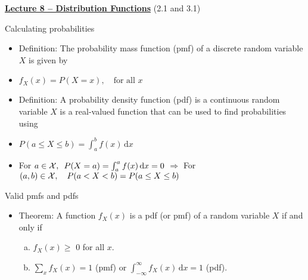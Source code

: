 \documentclass{article}
\newcommand{\bu}[1]{\textbf{\ul{#1}}}				%
\newcommand{\integral}[4]{\int_{#1}^{#2} #3 \,\mathrm{d} #4}		%
\begin{document}
{\large \bu{Lecture 8 -- Distribution Functions}} (2.1 and 3.1)\bigskip

Calculating probabilities
\begin{itemize}
    \item Definition: The probability mass function (pmf) of a discrete random variable $X$ is given by
    \item[] $f_X(x) = P(X = x), \quad \text{for all } x$
    \item Definition: A probability density function (pdf) is a continuous random variable $X$ is a real-valued function that can be used to find probabilities using
    \item[] $P(a \le X \le b) = \integral{a}{b}{f(x)}{x}$
    \item[] For $a \in {\cal X}, \hspace{5pt} P(X = a) = \integral{a}{a}{f(x)}{x} = 0$ \hspace{5pt} $\Longrightarrow$ \hspace{5pt} For $(a, b) \in {\cal X}, \hspace{10pt} P(a < X < b) =  P(a \le X \le b)$
\end{itemize}\bigskip

Valid pmfs and pdfs
\begin{itemize}
    \item Theorem: A function $f_X(x)$ is a pdf (or pmf) of a random variable $X$ if and only if
    \begin{enumerate}[(a)]
        \item  $f_X(x) \ge $ 0 for all $x$.
        \item $\displaystyle \sum_x f_X(x) = 1$ (pmf) \hspace{20pt} or \hspace{20pt} $\integral{-\infty}{\infty} {f_X(x)}{x} = 1$ (pdf). 
    \end{enumerate}
\end{itemize}\bigskip
\end{document}
